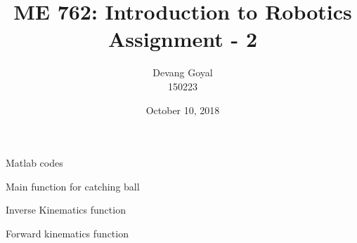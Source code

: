 \documentclass[a4paper,11pt]{article}
\title{ME 762: Introduction to Robotics \\ {Assignment - 2}}
\author{Devang Goyal \\ {150223}}
\date{October 10, 2018}
\begin{document}
\maketitle
\begin{section}{Matlab codes}
\begin{subsection}{Main function for catching ball}

\end{subsection}
\vspace{10 mm}
\begin{subsection}{Inverse Kinematics function}

\end{subsection}
\vspace{10 mm}
\begin{subsection}{Forward kinematics function}

\end{subsection}
\end{section}
\end{document}
